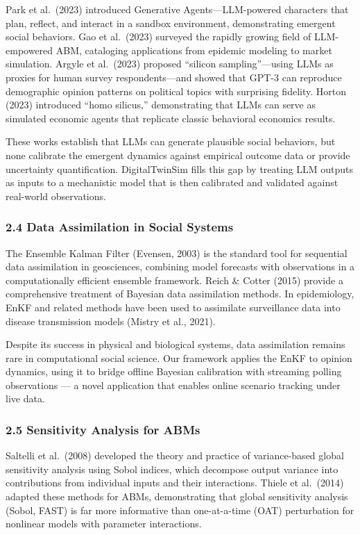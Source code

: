 \documentclass[
]{article}
\begin{document}
Park et al.~(2023) introduced Generative Agents---LLM-powered characters
that plan, reflect, and interact in a sandbox environment, demonstrating
emergent social behaviors. Gao et al.~(2023) surveyed the rapidly
growing field of LLM-empowered ABM, cataloging applications from
epidemic modeling to market simulation. Argyle et al.~(2023) proposed
``silicon sampling''---using LLMs as proxies for human survey
respondents---and showed that GPT-3 can reproduce demographic opinion
patterns on political topics with surprising fidelity. Horton (2023)
introduced ``homo silicus,'' demonstrating that LLMs can serve as
simulated economic agents that replicate classic behavioral economics
results.

These works establish that LLMs can generate plausible social behaviors,
but none calibrate the emergent dynamics against empirical outcome data
or provide uncertainty quantification. DigitalTwinSim fills this gap by
treating LLM outputs as inputs to a mechanistic model that is then
calibrated and validated against real-world observations.

\subsubsection{2.4 Data Assimilation in Social
Systems}\label{data-assimilation-in-social-systems}

The Ensemble Kalman Filter (Evensen, 2003) is the standard tool for
sequential data assimilation in geosciences, combining model forecasts
with observations in a computationally efficient ensemble framework.
Reich \& Cotter (2015) provide a comprehensive treatment of Bayesian
data assimilation methods. In epidemiology, EnKF and related methods
have been used to assimilate surveillance data into disease transmission
models (Mistry et al., 2021).

Despite its success in physical and biological systems, data
assimilation remains rare in computational social science. Our framework
applies the EnKF to opinion dynamics, using it to bridge offline
Bayesian calibration with streaming polling observations --- a novel
application that enables online scenario tracking under live data.

\subsubsection{2.5 Sensitivity Analysis for
ABMs}\label{sensitivity-analysis-for-abms}

Saltelli et al.~(2008) developed the theory and practice of
variance-based global sensitivity analysis using Sobol indices, which
decompose output variance into contributions from individual inputs and
their interactions. Thiele et al.~(2014) adapted these methods for ABMs,
demonstrating that global sensitivity analysis (Sobol, FAST) is far more
informative than one-at-a-time (OAT) perturbation for nonlinear models
with parameter interactions.
\end{document}
